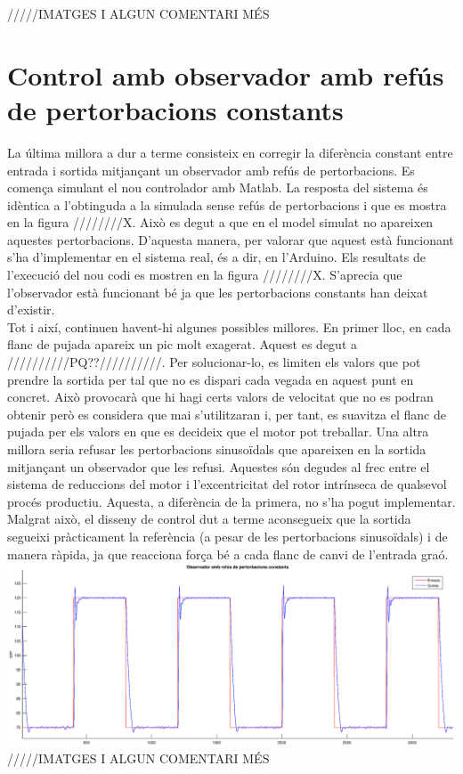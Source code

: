 \documentclass[]{article}
\begin{document}
/////IMATGES I ALGUN COMENTARI MÉS


\section{Control amb observador amb refús de pertorbacions constants}

La última millora a dur a terme consisteix en corregir la diferència constant entre entrada i sortida mitjançant un observador amb refús de pertorbacions. Es comença simulant el nou controlador amb Matlab. La resposta del sistema és idèntica a l'obtinguda a la simulada sense refús de pertorbacions i que es mostra en la figura ////////X. Això es degut a que en el model simulat no apareixen aquestes pertorbacions. D'aquesta manera, per valorar que aquest està funcionant s'ha d'implementar en el sistema real, és a dir, en l'Arduino. Els resultats de l'execució del nou codi es mostren en la figura ////////X. S'aprecia que l'observador està funcionant bé ja que les pertorbacions constants han deixat d'existir. \\

Tot i així, continuen havent-hi algunes possibles millores. En primer lloc, en cada flanc de pujada apareix un pic molt exagerat. Aquest es degut a //////////PQ??//////////. Per solucionar-lo, es limiten els valors que pot prendre la sortida per tal que no es dispari cada vegada en aquest punt en concret. Això provocarà que hi hagi certs valors de velocitat que no es podran obtenir però es considera que mai s'utilitzaran i, per tant, es suavitza el flanc de pujada per els valors en que es decideix que el motor pot treballar. Una altra millora seria refusar les pertorbacions sinusoïdals que apareixen en la sortida mitjançant un observador que les refusi. Aquestes són degudes al frec entre el sistema de reduccions del motor i l'excentricitat del rotor intrínseca de qualsevol procés productiu. Aquesta, a diferència de la primera, no s'ha pogut implementar. Malgrat això, el disseny de control dut a terme aconsegueix que la sortida segueixi pràcticament la referència (a pesar de les pertorbacions sinusoïdals) i de manera ràpida, ja que reacciona força bé a cada flanc de canvi de l'entrada graó. \\ 

\includegraphics[scale=1]{Entrada_Sortida_Refus_Constant.eps} /////IMATGES I ALGUN COMENTARI MÉS
\end{document}
